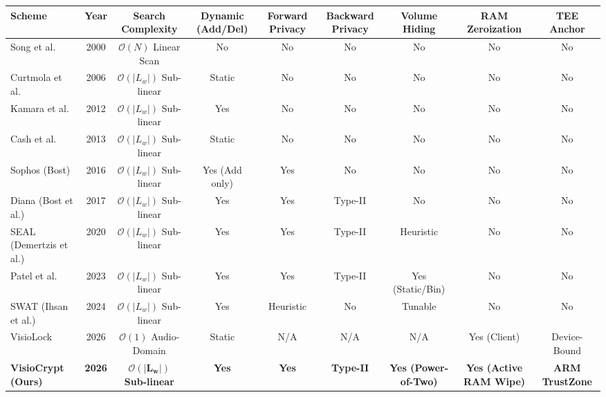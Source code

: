 \documentclass[preview,varwidth=180mm]{standalone}
\begin{document}
\begin{table}[t]
\centering
\small
\begin{tabular}{lcccccccc}
\toprule
\textbf{Scheme} & \textbf{Year} & \textbf{Search Complexity} & \textbf{Dynamic (Add/Del)} & \textbf{Forward Privacy} & \textbf{Backward Privacy} & \textbf{Volume Hiding} & \textbf{RAM Zeroization} & \textbf{TEE Anchor} \\ \midrule
Song et al. & 2000 & $\mathcal{O}(N)$ Linear Scan & No & No & No & No & No & No \\
Curtmola et al. & 2006 & $\mathcal{O}(|L_w|)$ Sub-linear & Static & No & No & No & No & No \\
Kamara et al. & 2012 & $\mathcal{O}(|L_w|)$ Sub-linear & Yes & No & No & No & No & No \\
Cash et al. & 2013 & $\mathcal{O}(|L_w|)$ Sub-linear & Static & No & No & No & No & No \\
Sophos (Bost) & 2016 & $\mathcal{O}(|L_w|)$ Sub-linear & Yes (Add only) & Yes & No & No & No & No \\
Diana (Bost et al.) & 2017 & $\mathcal{O}(|L_w|)$ Sub-linear & Yes & Yes & Type-II & No & No & No \\
SEAL (Demertzis et al.) & 2020 & $\mathcal{O}(|L_w|)$ Sub-linear & Yes & Yes & Type-II & Heuristic & No & No \\
Patel et al. & 2023 & $\mathcal{O}(|L_w|)$ Sub-linear & Yes & Yes & Type-II & Yes (Static/Bin) & No & No \\
SWAT (Ihsan et al.) & 2024 & $\mathcal{O}(|L_w|)$ Sub-linear & Yes & Heuristic & No & Tunable & No & No \\
VisioLock & 2026 & $\mathcal{O}(1)$ Audio-Domain & Static & N/A & N/A & N/A & Yes (Client) & Device-Bound \\
\textbf{VisioCrypt (Ours)} & \textbf{2026} & $\mathbf{\mathcal{O}(|L_w|)}$ \textbf{Sub-linear} & \textbf{Yes} & \textbf{Yes} & \textbf{Type-II} & \textbf{Yes (Power-of-Two)} & \textbf{Yes (Active RAM Wipe)} & \textbf{ARM TrustZone} \\ \bottomrule
\end{tabular}
\end{table}
\end{document}
